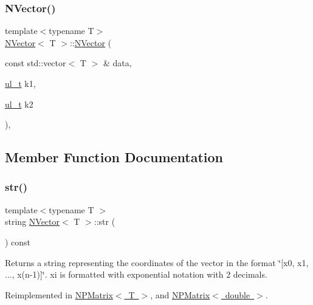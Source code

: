 \subsubsection{\texorpdfstring{NVector()}{NVector()}\hspace{0.1cm}{\footnotesize\ttfamily [5/5]}}
{\footnotesize\ttfamily template$<$typename T$>$ \\
\mbox{\hyperlink{class_n_vector}{N\+Vector}}$<$ T $>$\+::\mbox{\hyperlink{class_n_vector}{N\+Vector}} (\begin{DoxyParamCaption}\item[{const std\+::vector$<$ T $>$ \&}]{data,  }\item[{\mbox{\hyperlink{typedef_8h_a1b140a2034db3f5dfe18a987745df43a}{ul\+\_\+t}}}]{k1,  }\item[{\mbox{\hyperlink{typedef_8h_a1b140a2034db3f5dfe18a987745df43a}{ul\+\_\+t}}}]{k2 }\end{DoxyParamCaption})\hspace{0.3cm}{\ttfamily [explicit]}, {\ttfamily [protected]}}



\subsection{Member Function Documentation}
\mbox{\label{class_n_vector_a6d66b06b953197c1b3965ed69f9fd17e}} 
\subsubsection{\texorpdfstring{str()}{str()}}
{\footnotesize\ttfamily template$<$typename T $>$ \\
string \mbox{\hyperlink{class_n_vector}{N\+Vector}}$<$ T $>$\+::str (\begin{DoxyParamCaption}{ }\end{DoxyParamCaption}) const\hspace{0.3cm}{\ttfamily [virtual]}}

\begin{DoxyReturn}{Returns}
a string representing the coordinates of the vector in the format \char`\"{}\mbox{[}x0, x1, ..., x(n-\/1)\mbox{]}\char`\"{}. xi is formatted with exponential notation with 2 decimals. 
\end{DoxyReturn}


Reimplemented in \mbox{\hyperlink{class_n_p_matrix_ac60d089a0a4b6d0a1df3cf549f50028d}{N\+P\+Matrix$<$ T $>$}}, and \mbox{\hyperlink{class_n_p_matrix_ac60d089a0a4b6d0a1df3cf549f50028d}{N\+P\+Matrix$<$ double $>$}}.

